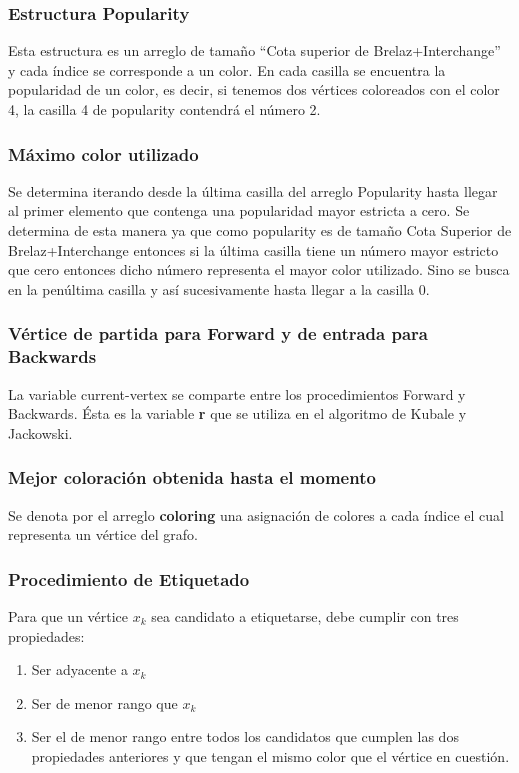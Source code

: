 \documentclass[a4paper,10pt]{article}
\begin{document}
\subsubsection{Estructura Popularity}
Esta estructura es un arreglo de tamaño ``Cota superior de Brelaz+Interchange'' y cada índice 
se corresponde a un color. En cada casilla se encuentra la popularidad de un color, es decir, 
si tenemos dos vértices coloreados con el color 4, la casilla 4 de popularity contendrá el número 2.

\subsubsection{Máximo color utilizado}

Se determina iterando desde la última casilla del arreglo Popularity hasta llegar al primer 
elemento que contenga una popularidad mayor estricta a cero. Se determina de esta manera ya que 
como popularity es de tamaño Cota Superior de Brelaz+Interchange entonces si la última casilla 
tiene un número mayor estricto que cero entonces dicho número representa el mayor color utilizado. 
Sino se busca en la penúltima casilla y así sucesivamente hasta llegar a la casilla 0.

\subsubsection{Vértice de partida para Forward y de entrada para Backwards}

La variable current-vertex se comparte entre los procedimientos Forward y Backwards. 
Ésta es la variable \textbf{r} que se utiliza en el algoritmo de Kubale y Jackowski. 

\subsubsection{Mejor coloración obtenida hasta el momento}

Se denota por el arreglo \textbf{coloring} una asignación de colores a cada índice 
el cual representa un vértice del grafo.

\subsubsection{Procedimiento de Etiquetado}

Para que un vértice $x_{k}$ sea candidato a etiquetarse, debe cumplir con tres propiedades:

\begin{enumerate}
 \item Ser adyacente a $x_{k}$
 \item Ser de menor rango que $x_{k}$
 \item Ser el de menor rango entre todos los candidatos que cumplen 
       las dos propiedades anteriores y que tengan el mismo color 
	que el vértice en cuestión.
\end{enumerate}
\end{document}
